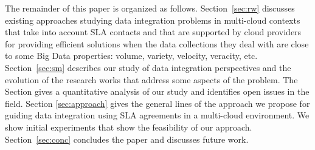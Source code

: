 The remainder of this paper is organized as follows. 
Section~\ref{sec:rw} discusses existing approaches studying data integration problems in multi-cloud contexts that take into account SLA contacts and that are supported by cloud providers for providing efficient solutions when the data collections they deal with are close to some Big Data properties: volume, variety, velocity, veracity, etc.
Section~\ref{sec:sm} describes our study of  data integration perspectives and the evolution of the research works that address some aspects of the problem. The Section gives a quantitative analysis of our study and identifies open issues in the field. Section \ref{sec:approach} gives the general lines of the approach we propose for guiding data integration using SLA agreements in a multi-cloud environment. We show initial experiments that show the feasibility of our approach.  
Section~\ref{sec:conc} concludes the paper and discusses future work. 


